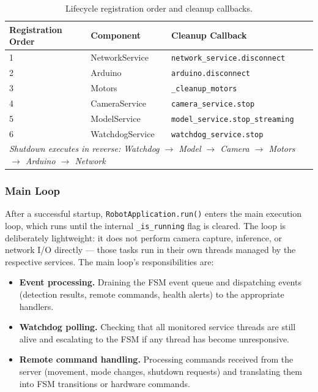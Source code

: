 \begin{table}[h]
	\centering
	\caption{Lifecycle registration order and cleanup callbacks.}
	\label{tab:lifecycle_reg}
	\begin{tabular}{lll}
		\hline
		\textbf{Registration Order} & \textbf{Component} & \textbf{Cleanup Callback} \\
		\hline
		1 & NetworkService   & \texttt{network\_service.disconnect}  \\
		2 & Arduino          & \texttt{arduino.disconnect}           \\
		3 & Motors           & \texttt{\_cleanup\_motors}            \\
		4 & CameraService    & \texttt{camera\_service.stop}         \\
		5 & ModelService     & \texttt{model\_service.stop\_streaming} \\
		6 & WatchdogService  & \texttt{watchdog\_service.stop}       \\
		\hline
		\multicolumn{3}{l}{\textit{Shutdown executes in reverse: Watchdog
				$\to$ Model $\to$ Camera $\to$ Motors $\to$ Arduino $\to$ Network}} \\
		\hline
	\end{tabular}
\end{table}

\subsubsection{Main Loop}
\label{sec:main_loop}

After a successful startup, \texttt{RobotApplication.run()} enters
the main execution loop, which runs until the internal
\texttt{\_is\_running} flag is cleared. The loop is deliberately
lightweight: it does not perform camera capture, inference, or network
I/O directly — those tasks run in their own threads managed by the
respective services. The main loop's responsibilities are:

\begin{itemize}
	\item \textbf{Event processing.} Draining the FSM event queue
	and dispatching events (detection results, remote commands,
	health alerts) to the appropriate handlers.
	\item \textbf{Watchdog polling.} Checking that all monitored
	service threads are still alive and escalating to the FSM
	if any thread has become unresponsive.
	\item \textbf{Remote command handling.} Processing commands
	received from the server (movement, mode changes, shutdown
	requests) and translating them into FSM transitions or
	hardware commands.
\end{itemize}

